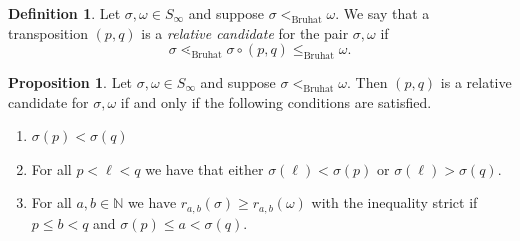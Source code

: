 \documentclass[oneside,11pt,reqno]{amsart}
\newcommand{\nn}{\ensuremath{\mathbb{N}}}
\theoremstyle{definition}
\newtheorem{definition}{Definition}
\newtheorem{proof techniques}{Proof Techniques}
\newtheorem{proposition}{Proposition}
\begin{document}
\begin{definition}
    Let $\sigma , \omega \in S_\infty$ and suppose $\sigma <_\text{Bruhat} \omega$. We say that a transposition $(p , q)$ is a \emph{relative candidate} for the pair $\sigma , \omega$ if 
    \begin{equation*}\label{eq: relative candidate equation}
        \sigma \lessdot_\text{Bruhat} \sigma \circ (p , q) \leq_\text{Bruhat} \omega.
    \end{equation*} 
\end{definition}

\begin{proposition}\label{prop: equivalent characterization of relative candidate}
     Let $\sigma , \omega \in S_\infty$ and suppose $\sigma <_\text{Bruhat} \omega$. Then $(p , q)$ is a relative candidate for $\sigma, \omega$ if and only if the following conditions are satisfied.  
     \begin{enumerate}
        \item[(C1)] $\sigma(p) < \sigma(q)$
        \item[(C2)] For all $p < \ell < q$ we have that either $\sigma(\ell) < \sigma(p)$ or $\sigma(\ell) > \sigma(q)$.
        \item[(C3)] For all $a , b \in \nn$ we have $r_{a , b}(\sigma) \geq r_{a , b}(\omega)$ with the inequality strict if $p \leq b < q$ and $\sigma(p) \leq a < \sigma(q)$. 
    \end{enumerate}
\end{proposition}
\end{document}
